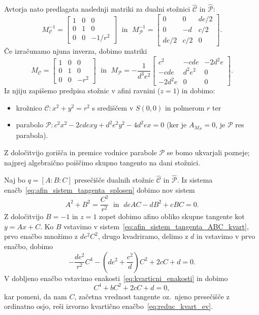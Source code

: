 Avtorja nato predlagata naslednji matriki za dualni stožnici $\mathcal{\hat{C}}$ in $\mathcal{\hat{P}}$:
$$ M^{-1}_\mathcal{C} =
    \begin{bmatrix}
        1 & 0 & 0\\
        0 & 1 & 0\\
        0 & 0 & -1/r^2
    \end{bmatrix}
\; \text{ in } \; M^{-1}_\mathcal{P} =
    \begin{bmatrix}
        0 & 0 & de/2\\
        0 & -d & c/2\\
        de/2 & c/2 & 0
    \end{bmatrix}.
$$
Če izračunamo njuna inverza, dobimo matriki
$$ M_\mathcal{C} =
    \begin{bmatrix}
        1 & 0 & 0\\
        0 & 1 & 0\\
        0 & 0 & -r^2
    \end{bmatrix}
    \; \text{ in } \; M_\mathcal{P} = -\frac{1}{d^3e^2}
    \begin{bmatrix}
        c^2 & -cde & -2d^2e\\
        -cde & d^2e^2 & 0\\
        -2d^2e & 0 & 0
    \end{bmatrix}.
$$
Iz njiju zapišemo predpisa stožnic v afini ravnini ($z = 1$) in dobimo:
\begin{itemize}
    \item krožnico $\mathcal{C}: x^2 + y^2 = r^2$ s središčem v $S(0,0)$ in polmerom $r$ ter
    \item parabolo $\mathcal{P}: c^2x^2 - 2cdexy + d^2e^2y^2 - 4d^2ex = 0$ (ker je $A_{M_\mathcal{P}} = 0$, je $\mathcal{P}$ res parabola).
\end{itemize}
Z določitvijo gorišča in premice vodnice parabole $\mathcal{P}$ se bomo ukvarjali pozneje; najprej algebraično poiščimo skupno tangento na dani stožnici.

Naj bo $q = [A : B : C]$ presečišče dualnih stožnic $\mathcal{\hat{C}}$ in $\mathcal{\hat{P}}$. Iz sistema enačb~\ref{eq:afin_sistem_tangenta_splosen} dobimo nov sistem
\begin{equation}
    \label{eq:afin_sistem_tangenta_ABC_kvart}
    A^2 + B^2 = \frac{C^2}{r^2} \; \text{ in } \; deAC - dB^2 + cBC = 0.
\end{equation}
Z določitvijo $B = -1$ in $z = 1$ zopet dobimo afino obliko skupne tangente kot $y = Ax + C$. Ko $B$ vstavimo v sistem~\ref{eq:afin_sistem_tangenta_ABC_kvart}, prvo enačbo množimo z $de^2C^2$, drugo kvadriramo, delimo z $d$ in vstavimo v prvo enačbo, dobimo
$$ - \frac{de^2}{r^2}C^4 - (de^2 + \frac{c^2}{d})C^2 + 2cC + d = 0.$$
V dobljeno enačbo vstavimo enakosti~\ref{eq:kvarticni_enakosti} in dobimo
$$C^4 + bC^2 + 2cC + d = 0,$$
kar pomeni, da nam $C$, začetna vrednost tangente oz.\ njeno presečišče z ordinatno osjo, reši izvorno kvartično enačbo~\ref{eq:reduc_kvart_ev}.

